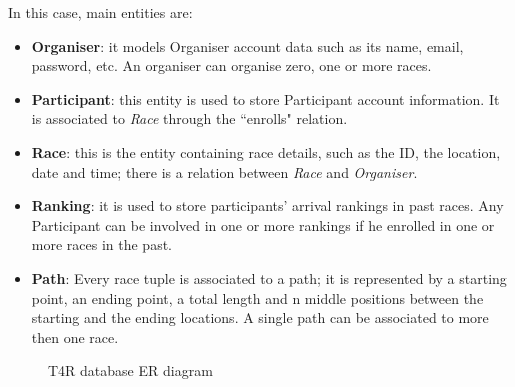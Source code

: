 In this case, main entities are:
\begin{itemize}
    \item \textbf{Organiser}: it models Organiser account data such as its name, email, password, etc. An organiser can organise zero, one or more races.
    \item \textbf{Participant}: this entity is used to store Participant account information. It is associated to \emph{Race} through the ``enrolls" relation.
    \item \textbf{Race}: this is the entity containing race details, such as the ID, the location, date and time; there is a relation between \emph{Race} and \emph{Organiser}.
    \item \textbf{Ranking}: it is used to store participants' arrival rankings in past races. Any Participant can be involved in one or more rankings if he enrolled in one or more races in the past.
    \item \textbf{Path}: Every race tuple is associated to a path; it is represented by a starting point, an ending point, a total length and n middle positions between the starting and the ending locations. A single path can be associated to more then one race.
\end{itemize}

\begin{figure}[H]
    \centering
    \caption{T4R database ER diagram}
    \label{fig:T4R-er}
\end{figure}

